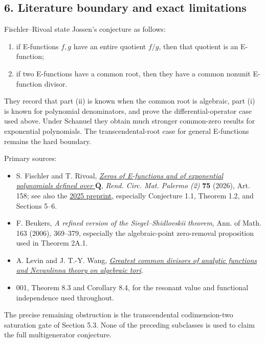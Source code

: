 \subsection{6. Literature boundary and exact limitations}

Fischler--Rivoal state Jossen's conjecture as follows:

\begin{enumerate}
\def\labelenumi{\arabic{enumi}.}
\tightlist
\item
  if E-functions \(f,g\) have an entire quotient \(f/g\), then that quotient
  is an E-function;
\item
  if two E-functions have a common root, then they have a common nonunit
  E-function divisor.
\end{enumerate}

They record that part (ii) is known when the common root is algebraic, part
(i) is known for polynomial denominators, and prove the differential-operator
case used above. Under Schanuel they obtain much stronger common-zero results
for exponential polynomials. The transcendental-root case for general
E-functions remains the hard boundary.

Primary sources:

\begin{itemize}
\tightlist
\item
  S. Fischler and T. Rivoal, \href{https://doi.org/10.1007/s12215-026-01475-x}{\emph{Zeros of E-functions and of exponential
  polynomials defined over} \(\overline{\mathbf Q}\)},
  \emph{Rend. Circ. Mat. Palermo (2)} \textbf{75} (2026), Art. 158; see also the
  \href{https://arxiv.org/abs/2503.20345}{2025 preprint}, especially Conjecture 1.1,
  Theorem 1.2, and Sections 5--6.
\item
  F. Beukers, \emph{A refined version of the Siegel--Shidlovskii theorem},
  Ann. of Math. 163 (2006), 369--379, especially the algebraic-point
  zero-removal proposition used in Theorem 2A.1.
\item
  A. Levin and J. T.-Y. Wang, \href{https://arxiv.org/abs/1903.03876}{\emph{Greatest common divisors of analytic functions
  and Nevanlinna theory on algebraic tori}}.
\item
  001, Theorem 8.3 and Corollary 8.4, for the resonant value and functional
  independence used throughout.
\end{itemize}

The precise remaining obstruction is the transcendental codimension-two
saturation gate of Section 5.3.  None of the preceding subclasses is used to
claim the full multigenerator conjecture.
